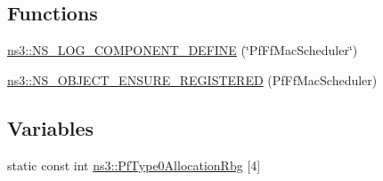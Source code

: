 \subsection*{Functions}
\begin{DoxyCompactItemize}
\item 
\hyperlink{namespacens3_abd59fb03b3e584d2ef6835f62fe8f2b3}{ns3\+::\+N\+S\+\_\+\+L\+O\+G\+\_\+\+C\+O\+M\+P\+O\+N\+E\+N\+T\+\_\+\+D\+E\+F\+I\+NE} (\char`\"{}Pf\+Ff\+Mac\+Scheduler\char`\"{})
\item 
\hyperlink{namespacens3_ab6a08479750df12ce083e2a5bdad520f}{ns3\+::\+N\+S\+\_\+\+O\+B\+J\+E\+C\+T\+\_\+\+E\+N\+S\+U\+R\+E\+\_\+\+R\+E\+G\+I\+S\+T\+E\+R\+ED} (Pf\+Ff\+Mac\+Scheduler)
\end{DoxyCompactItemize}
\subsection*{Variables}
\begin{DoxyCompactItemize}
\item 
static const int \hyperlink{namespacens3_a072a6e44a09f8902b3de89550190b42b}{ns3\+::\+Pf\+Type0\+Allocation\+Rbg} \mbox{[}4\mbox{]}
\end{DoxyCompactItemize}
